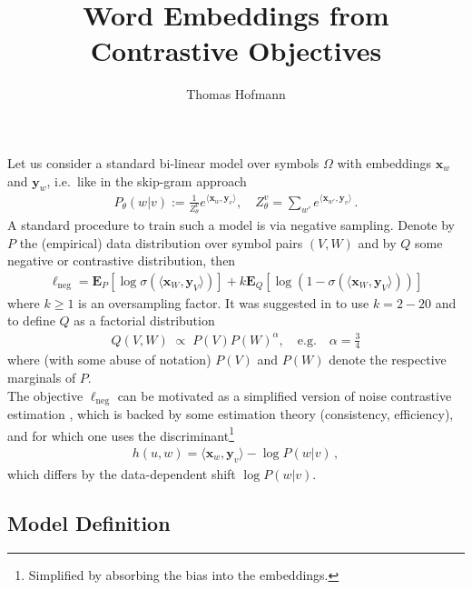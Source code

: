 \documentclass{article}
\title{
	Word Embeddings from Contrastive Objectives 
}
\author{Thomas Hofmann}
\newcommand{\E}{{\mathbf E}}
\newcommand{\x}{{\mathbf x}}
\newcommand{\y}{{\mathbf y}}
\begin{document}
\maketitle 

Let us consider a standard bi-linear model over symbols $\Omega$ with embeddings $\x_w$ and $\y_w$, i.e.~like in the skip-gram approach \cite{mikolov2013distributed}
\begin{align}
P_\theta(w|v) := \frac{1}{Z^v_\theta} e^{\langle \x_w, \y_v \rangle}, \quad Z^v_\theta = \sum_{w'}  e^{\langle \x_{w'}, \y_v \rangle}\,.
\end{align}
A standard procedure to train such a model is via negative sampling. Denote by $P$ the (empirical) data distribution over symbol pairs $(V,W)$ and by $Q$ some negative or contrastive distribution, then 
\begin{align}
\ell_{\text{neg}} = 
	\E_P\left[ \log \sigma(\langle \x_W, \y_V \rangle) \right] 
+ k	\E_Q\left[ \log (1-\sigma(\langle \x_W, \y_V \rangle)) \right] 
\end{align}
where $k \ge 1$ is an oversampling factor. It was suggested in \cite{mikolov2013distributed} to use $k=2-20$ and to define $Q$ as a factorial distribution 
\begin{align}
Q(V,W) \; \propto \; P(V) P(W)^\alpha, \quad \text{e.g.} \quad \alpha = \tfrac 34
\end{align}
where (with some abuse of notation) $P(V)$ and $P(W)$ denote the respective marginals of $P$.\\

The objective $\ell_{\text{neg}}$ can be motivated as a simplified version of noise contrastive estimation \cite{gutmann2012noise,mnih2013learning}, which is backed by some estimation theory (consistency, efficiency), and for which one uses the discriminant\footnote{Simplified by absorbing the bias into the embeddings.}
\begin{align}
h(u,w) = \langle \x_w, \y_v\rangle - \log P(w|v)\,,
\end{align}
which differs by the data-dependent shift $\log P(w|v)$. 

\newpage

\subsection*{Model Definition}
\end{document}
